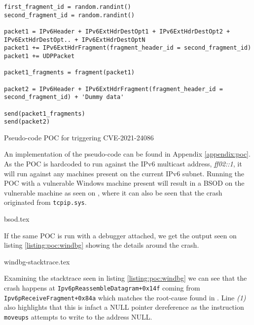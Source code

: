 \documentclass{report}
\begin{document}
\begin{listing}[H]
\begin{verbatim}
first_fragment_id = random.randint()
second_fragment_id = random.randint()

packet1 = IPv6Header + IPv6ExtHdrDestOpt1 + IPv6ExtHdrDestOpt2 + IPv6ExtHdrDestOpt.. + IPv6ExtHdrDestOptN
packet1 += IPv6ExtHdrFragment(fragment_header_id = second_fragment_id)
packet1 += UDPPacket

packet1_fragments = fragment(packet1)

packet2 = IPv6Header + IPv6ExtHdrFragment(fragment_header_id = second_fragment_id) + 'Dummy data'

send(packet1_fragments)
send(packet2)
\end{verbatim}
\caption{Pseudo-code \gls{POC} for triggering CVE-2021-24086}
\label{listing:poc:pseudo}
\end{listing}

An implementation of the pseudo-code can be found in Appendix \ref{appendix:poc}. As the \gls{POC} is hardcoded to run against the IPv6 multicast address, \emph{ff02::1}, it will run against any machines present on the current IPv6 subnet. Running the \gls{POC} with a vulnerable Windows machine present will result in a \gls{BSOD} on the vulnerable machine as seen on , where it can also be seen that the crash originated from \texttt{tcpip.sys}.

{bsod.tex}

If the same \gls{POC} is run with a debugger attached, we get the output seen on listing \ref{listing:poc:windbg} showing the details around the crash.

{windbg-stacktrace.tex}

Examining the stacktrace seen in listing \ref{listing:poc:windbg} we can see that the crash happens at \texttt{Ipv6pReassembleDatagram+0x14f} coming from \texttt{Ipv6pReceiveFragment+0x84a} which matches the root-cause found in . Line \emph{(1)} also highlights that this is infact a NULL pointer dereference as the instruction \texttt{moveups} attempts to write to the address NULL.
\end{document}
